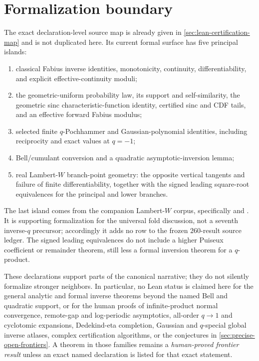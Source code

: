 \section{Formalization boundary}
\label{sec:ref-formalization-boundary}

The exact declaration-level source map is already given in
\cref{sec:lean-certification-map} and is not duplicated here.  Its current
formal surface has five principal islands:

\begin{enumerate}
\item classical Fabius inverse identities, monotonicity, continuity,
  differentiability, and explicit effective-continuity moduli;
\item the geometric-uniform probability law, its support and self-similarity,
  the geometric sinc characteristic-function identity, certified sinc and CDF
  tails, and an effective forward Fabius modulus;
\item selected finite \(q\)-Pochhammer and Gaussian-polynomial identities,
  including reciprocity and exact values at \(q=-1\);
\item Bell/cumulant conversion and a quadratic asymptotic-inversion lemma;
\item real Lambert-\(W\) branch-point geometry: the opposite vertical
  tangents and failure of finite differentiability, together with the signed
  leading square-root equivalences for the principal and lower branches.
\end{enumerate}

The last island comes from the companion Lambert-\(W\) corpus, specifically
 and
.  It is supporting formalization
for the universal fold discussion, not a seventh inverse-\(q\) precursor;
accordingly it adds no row to the frozen \(260\)-result source ledger.  The
signed leading equivalences do not include a higher Puiseux coefficient or
remainder theorem, still less a formal inversion theorem for a
\(q\)-product.

These declarations support parts of the canonical narrative; they do not
silently formalize stronger neighbors.  In particular, no Lean status is
claimed here for the general analytic and formal inverse theorems beyond the
named Bell and quadratic support, or for the human proofs of infinite-product
normal convergence, remote-gap and log-periodic asymptotics, all-order
\(q\to1\) and cyclotomic expansions, Dedekind-eta completion, Gaussian and
\(q\)-special global inverse atlases, complex certification algorithms, or
the conjectures in
\cref{sec:precise-open-frontiers}.  A theorem in those families remains a
\emph{human-proved frontier result} unless an exact named declaration is
listed for that exact statement.

